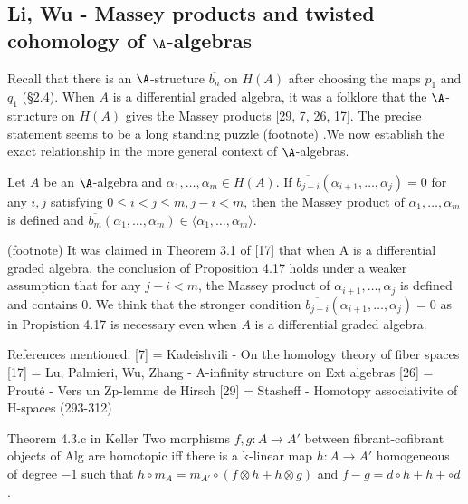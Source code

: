 
\subsection{Li, Wu - Massey products and twisted cohomology of $\A$-algebras}

Recall that there is an $\A$-structure $\overline{b_n}$ on $H(A)$ after choosing the maps $p_1$ and $q_1$ (§2.4). When $A$ is a differential graded algebra, it was a folklore that the $\A$-structure on $H(A)$ gives the Massey products [29, 7, 26, 17]. The precise statement seems to be a long standing puzzle (footnote) .We now establish the exact relationship in the more general context of $\A$-algebras.

\begin{proposition}{4.17}

Let $A$ be an $\A$-algebra and $\alpha_1, \ldots, \alpha_m \in H(A)$. If $\overline{b_{j-i}}(\alpha_{i+1}, \ldots, \alpha_j) = 0$ for any $i, j$ satisfying $0 \leq i < j \leq m, j − i < m$, then the Massey product of $\alpha_1, \ldots, \alpha_m$ is defined and $\overline{b_m}(\alpha_1, \ldots, \alpha_m) \in \langle \alpha_1, \ldots, \alpha_m\rangle$.
\end{proposition}

(footnote) It was claimed in Theorem 3.1 of [17] that when A is a differential graded algebra, the conclusion of Proposition 4.17 holds under a weaker assumption that for any $j−i < m$, the Massey product of $\alpha_{i+1}, \ldots, \alpha_j$ is defined and contains $0$. We think that the stronger condition $\overline{b_{j-i}}(\alpha_{i+1}, \ldots, \alpha_j) = 0$ as in Propistion 4.17 is necessary even when $A$ is a differential graded algebra.


References mentioned: 
[7]  = Kadeishvili - On the homology theory of fiber spaces
[17] = Lu, Palmieri, Wu, Zhang - A-infinity structure on Ext algebras
[26] = Prouté - Vers un Zp-lemme de Hirsch
[29] = Stasheff - Homotopy associativite of H-spaces (293-312)

\begin{proposition}{Theorem 4.3.c in Keller}
Two morphisms $f, g : A \longrightarrow A'$ between fibrant-cofibrant objects of Alg are homotopic iff there is a k-linear map $h : A \longrightarrow A'$ homogeneous of degree −1 such that $h \circ m_A = m_{A'} \circ (f \otimes h + h \otimes g)$ and $f − g = d \circ h + h +\circ d$.
\end{proposition}

